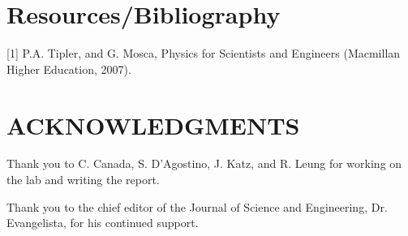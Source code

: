 \documentclass[twocolumn, 10pt]{article}
\begin{document}
\section*{Resources/Bibliography}
[1] P.A. Tipler, and G. Mosca, Physics for Scientists and Engineers (Macmillan Higher Education, 2007).



\section*{ACKNOWLEDGMENTS} 
Thank you to C. Canada, S. D’Agostino, J. Katz, and R. Leung for working on the lab and writing the report.

Thank you to the chief editor of the Journal of Science and Engineering, Dr. Evangelista, for his continued support.
\end{document}
